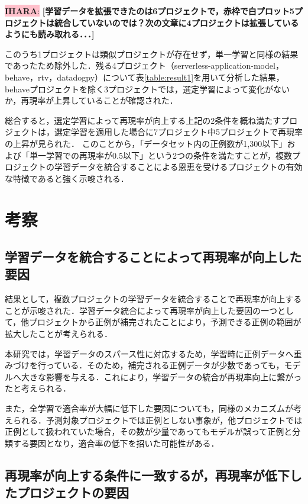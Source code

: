 \documentclass[submit]{ipsj}
\newcommand{\ihara}[1]{\colorbox{pink}{{\bf IHARA}:}{\color{blue} {\textbf{[#1]}}}}
\begin{document}
\ihara{学習データを拡張できたのは6プロジェクトで，赤枠で白プロット5プロジェクトは統合していないのでは？次の文章に4プロジェクトは拡張しているようにも読み取れる．．．}

このうち1プロジェクトは類似プロジェクトが存在せず，単一学習と同様の結果であったため除外した．残る4プロジェクト（serverless-application-model，behave，rtv，datadogpy）について表\ref{table:result1}を用いて分析した結果，behaveプロジェクトを除く3プロジェクトでは，選定学習によって変化がないか，再現率が上昇していることが確認された．


\begin{screen}
総合すると，選定学習によって再現率が向上する上記の2条件を概ね満たすプロジェクトは，選定学習を適用した場合に7プロジェクト中5プロジェクトで再現率の上昇が見られた．
このことから，「データセット内の正例数が1,300以下」および「単一学習での再現率が0.5以下」という2つの条件を満たすことが，複数プロジェクトの学習データを統合することによる恩恵を受けるプロジェクトの有効な特徴であると強く示唆される．
\end{screen}

\section{考察}\label{chap:consideration}

\subsection{学習データを統合することによって再現率が向上した要因}

結果として，複数プロジェクトの学習データを統合することで再現率が向上することが示唆された．学習データ統合によって再現率が向上した要因の一つとして，他プロジェクトから正例が補完されたことにより，予測できる正例の範囲が拡大したことが考えられる．

本研究では，学習データのスパース性に対応するため，学習時に正例データへ重みづけを行っている．そのため，補完される正例データが少数であっても，モデルへ大きな影響を与える．これにより，学習データの統合が再現率向上に繋がったと考えられる．

また，全学習で適合率が大幅に低下した要因についても，同様のメカニズムが考えられる．予測対象プロジェクトでは正例としない事象が，他プロジェクトでは正例として扱われていた場合，その数が少量であってもモデルが誤って正例と分類する要因となり，適合率の低下を招いた可能性がある．


\subsection{再現率が向上する条件に一致するが，再現率が低下したプロジェクトの要因}
\end{document}
